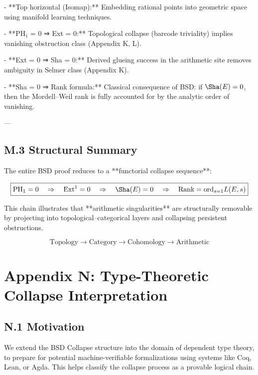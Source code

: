 \documentclass[11pt]{article}
\theoremstyle{definition}
\begin{document}
- **Top horizontal (Isomap):**  
  Embedding rational points into geometric space using manifold learning techniques.

- **PH₁ = 0 ⇒ Ext = 0:**  
  Topological collapse (barcode triviality) implies vanishing obstruction class (Appendix K, L).

- **Ext = 0 ⇒ Sha = 0:**  
  Derived glueing success in the arithmetic site removes ambiguity in Selmer class (Appendix K).

- **Sha = 0 ⇒ Rank formula:**  
  Classical consequence of BSD: if \( \Sha(E) = 0 \), then the Mordell–Weil rank is fully accounted for by the analytic order of vanishing.

---

\subsection*{M.3 Structural Summary}

The entire BSD proof reduces to a **functorial collapse sequence**:

\[
\boxed{
\mathrm{PH}_1 = 0 \quad \Rightarrow \quad \mathrm{Ext}^1 = 0 \quad \Rightarrow \quad \Sha(E) = 0 \quad \Rightarrow \quad \text{Rank} = \text{ord}_{s=1} L(E,s)
}
\]

This chain illustrates that **arithmetic singularities** are structurally removable  
by projecting into topological–categorical layers and collapsing persistent obstructions.

\[
\boxed{
\text{Topology} \to \text{Category} \to \text{Cohomology} \to \text{Arithmetic}
}
\]



\section*{Appendix N: Type-Theoretic Collapse Interpretation}

\subsection*{N.1 Motivation}

We extend the BSD Collapse structure into the domain of dependent type theory,  
to prepare for potential machine-verifiable formalizations using systems like Coq, Lean, or Agda.  
This helps classify the collapse process as a provable logical chain.
\end{document}
